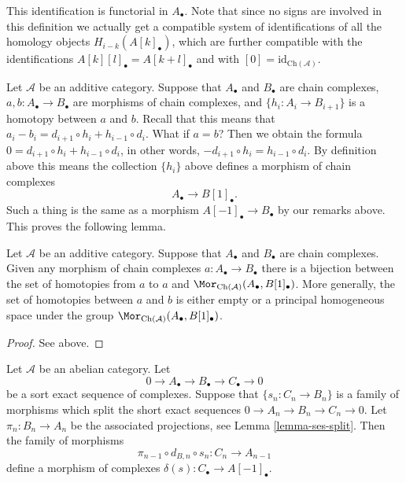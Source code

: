 \noindent
This identification is functorial in $A_\bullet$.
Note that since no signs are involved in this
definition we actually get a compatible system
of identifications of all the homology
objects $H_{i - k}(A[k]_\bullet)$, which are
further compatible with the identifications
$A[k][l]_\bullet = A[k + l]_\bullet$ and
with $[0] = \text{id}_{\text{Ch}(\mathcal{A})}$.

\medskip\noindent
Let $\mathcal{A}$ be an additive category.
Suppose that $A_\bullet$ and $B_\bullet$ are
chain complexes, $a, b : A_\bullet \to B_\bullet$ are
morphisms of chain complexes, and $\{h_i : A_i \to B_{i + 1}\}$
is a homotopy between $a$ and $b$. Recall that this means
that
$a_i - b_i = d_{i + 1} \circ h_i + h_{i - 1} \circ d_i$.
What if $a = b$? Then we obtain the formula
$0 = d_{i + 1} \circ h_i + h_{i - 1} \circ d_i$,
in other words, $ - d_{i + 1} \circ h_i = h_{i - 1} \circ d_i$.
By definition above this means the collection $\{h_i\}$
above defines a morphism of chain complexes
$$
A_\bullet \longrightarrow B[1]_\bullet.
$$
Such a thing is the same as a morphism $A[-1]_\bullet \to B_\bullet$
by our remarks above. This proves the following lemma.

\begin{lemma}
\label{lemma-homotopy-shift}
Let $\mathcal{A}$ be an additive category.
Suppose that $A_\bullet$ and $B_\bullet$ are
chain complexes. Given any morphism of chain
complexes $a : A_\bullet \to B_\bullet$ there
is a bijection between the set of homotopies
from $a$ to $a$ and
$\Mor_{\text{Ch}(\mathcal{A})}(A_\bullet, B[1]_\bullet)$.
More generally, the set of homotopies between
$a$ and $b$ is either empty or a principal homogeneous
space under the group
$\Mor_{\text{Ch}(\mathcal{A})}(A_\bullet, B[1]_\bullet)$.
\end{lemma}

\begin{proof}
See above.
\end{proof}

\begin{lemma}
\label{lemma-ses-termwise-split}
Let $\mathcal{A}$ be an abelian category.
Let
$$
0 \to A_\bullet \to B_\bullet \to C_\bullet \to 0
$$
be a sort exact sequence of complexes.
Suppose that $\{s_n : C_n \to B_n\}$ is a family
of morphisms which split the short exact sequences
$0 \to A_n \to B_n \to C_n \to 0$. Let
$\pi_n : B_n \to A_n$ be the associated
projections, see Lemma \ref{lemma-ses-split}.
Then the family of morphisms
$$
\pi_{n - 1} \circ d_{B, n} \circ s_n
:
C_n \to A_{n - 1}
$$
define a morphism of complexes $\delta(s) : C_\bullet \to A[-1]_\bullet$.
\end{lemma}

